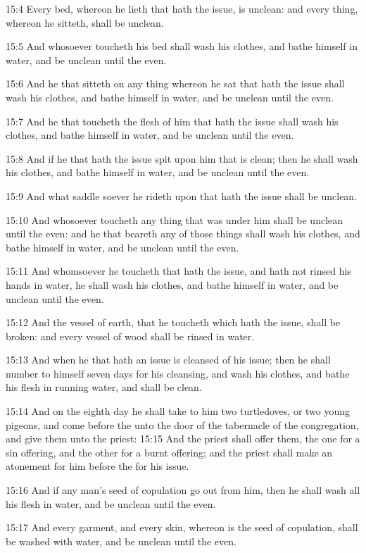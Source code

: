 15:4 Every bed, whereon he lieth that hath the issue, is unclean: and every thing, whereon he sitteth, shall be unclean.

15:5 And whosoever toucheth his bed shall wash his clothes, and bathe himself in water, and be unclean until the even.

15:6 And he that sitteth on any thing whereon he sat that hath the issue shall wash his clothes, and bathe himself in water, and be unclean until the even.

15:7 And he that toucheth the flesh of him that hath the issue shall wash his clothes, and bathe himself in water, and be unclean until the even.

15:8 And if he that hath the issue spit upon him that is clean; then he shall wash his clothes, and bathe himself in water, and be unclean until the even.

15:9 And what saddle soever he rideth upon that hath the issue shall be unclean.

15:10 And whosoever toucheth any thing that was under him shall be unclean until the even: and he that beareth any of those things shall wash his clothes, and bathe himself in water, and be unclean until the even.

15:11 And whomsoever he toucheth that hath the issue, and hath not rinsed his hands in water, he shall wash his clothes, and bathe himself in water, and be unclean until the even.

15:12 And the vessel of earth, that he toucheth which hath the issue, shall be broken: and every vessel of wood shall be rinsed in water.

15:13 And when he that hath an issue is cleansed of his issue; then he shall number to himself seven days for his cleansing, and wash his clothes, and bathe his flesh in running water, and shall be clean.

15:14 And on the eighth day he shall take to him two turtledoves, or two young pigeons, and come before the \LORD unto the door of the tabernacle of the congregation, and give them unto the priest: 15:15 And the priest shall offer them, the one for a sin offering, and the other for a burnt offering; and the priest shall make an atonement for him before the \LORD for his issue.

15:16 And if any man's seed of copulation go out from him, then he shall wash all his flesh in water, and be unclean until the even.

15:17 And every garment, and every skin, whereon is the seed of copulation, shall be washed with water, and be unclean until the even.

